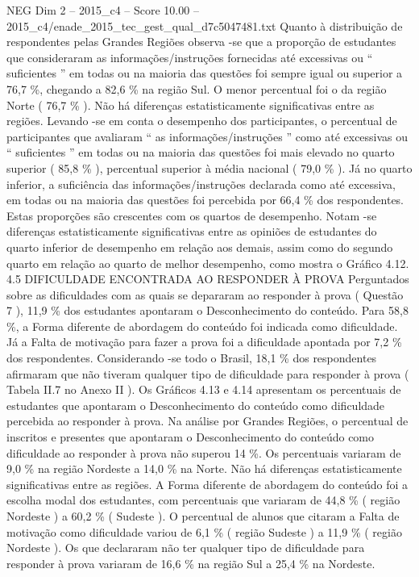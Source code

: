 \begin{textsample}{NEG Dim 2 – 2015\_c4 – Score 10.00 – 2015\_c4/enade\_2015\_tec\_gest\_qual\_d7c5047481.txt}
Quanto à distribuição de respondentes pelas Grandes Regiões observa -se que a proporção de estudantes que consideraram as informações/instruções fornecidas até excessivas ou “ suficientes ” em todas ou na maioria das questões foi sempre igual ou superior a 76,7 \%, chegando a 82,6 \% na região Sul.
O menor percentual foi o da região Norte ( 76,7 \% ).
Não há diferenças estatisticamente significativas entre as regiões.
Levando -se em conta o desempenho dos participantes, o percentual de participantes que avaliaram “ as informações/instruções ” como até excessivas ou “ suficientes ” em todas ou na maioria das questões foi mais elevado no quarto superior ( 85,8 \% ), percentual superior à média nacional ( 79,0 \% ).
Já no quarto inferior, a suficiência das informações/instruções declarada como até excessiva, em todas ou na maioria das questões foi percebida por 66,4 \% dos respondentes.
Estas proporções são crescentes com os quartos de desempenho.
Notam -se diferenças estatisticamente significativas entre as opiniões de estudantes do quarto inferior de desempenho em relação aos demais, assim como do segundo quarto em relação ao quarto de melhor desempenho, como mostra o Gráfico 4.12. 4.5 DIFICULDADE ENCONTRADA AO RESPONDER À PROVA Perguntados sobre as dificuldades com as quais se depararam ao responder à prova ( Questão 7 ), 11,9 \% dos estudantes apontaram o Desconhecimento do conteúdo.
Para 58,8 \%, a Forma diferente de abordagem do conteúdo foi indicada como dificuldade.
Já a Falta de motivação para fazer a prova foi a dificuldade apontada por 7,2 \% dos respondentes.
Considerando -se todo o Brasil, 18,1 \% dos respondentes afirmaram que não tiveram qualquer tipo de dificuldade para responder à prova ( Tabela II.7 no Anexo II ).
Os Gráficos 4.13 e 4.14 apresentam os percentuais de estudantes que apontaram o Desconhecimento do conteúdo como dificuldade percebida ao responder à prova.
Na análise por Grandes Regiões, o percentual de inscritos e presentes que apontaram o Desconhecimento do conteúdo como dificuldade ao responder à prova não superou 14 \%.
Os percentuais variaram de 9,0 \% na região Nordeste a 14,0 \% na Norte.
Não há diferenças estatisticamente significativas entre as regiões.
A Forma diferente de abordagem do conteúdo foi a escolha modal dos estudantes, com percentuais que variaram de 44,8 \% ( região Nordeste ) a 60,2 \% ( Sudeste ).
O percentual de alunos que citaram a Falta de motivação como dificuldade variou de 6,1 \% ( região Sudeste ) a 11,9 \% ( região Nordeste ).
Os que declararam não ter qualquer tipo de dificuldade para responder à prova variaram de 16,6 \% na região Sul a 25,4 \% na Nordeste.

\end{textsample}
